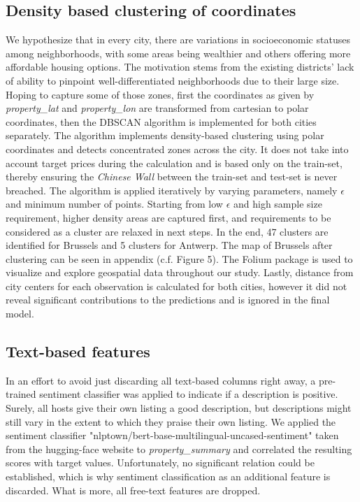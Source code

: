\documentclass[11pt, oneside]{article}   	%
\begin{document}
\subsection{Density based clustering of coordinates}
We hypothesize that in every city, there are variations in socioeconomic statuses among neighborhoods, with some areas being wealthier and others offering more affordable housing options. The motivation stems from the existing districts' lack of ability to pinpoint well-differentiated neighborhoods due to their large size. Hoping to capture some of those zones, first the coordinates as given by \textit{property\_lat} and \textit{property\_lon} are transformed from cartesian to polar coordinates, then the DBSCAN algorithm is implemented for both cities separately. The algorithm implements density-based clustering using polar coordinates and detects concentrated zones across the city. It does not take into account target prices during the calculation and is based only on the train-set, thereby ensuring the \textit{Chinese Wall} between the train-set and test-set is never breached.\newline 
\indent The algorithm is applied iteratively by varying parameters, namely $\epsilon$ and minimum number of points. Starting from low $\epsilon$ and high sample size requirement, higher density areas are captured first, and requirements to be considered as a cluster are relaxed in next steps. In the end, 47 clusters are identified for Brussels and 5 clusters for Antwerp.\newline 
\indent The map of Brussels after clustering can be seen in appendix (c.f. Figure 5). The Folium package is used to visualize and explore geospatial data throughout our study. Lastly, distance from city centers for each observation is calculated for both cities, however it did not reveal significant contributions to the predictions and is ignored in the final model.


\subsection{Text-based features}
In an effort to avoid just discarding all text-based columns right away, a pre-trained sentiment classifier was applied to indicate if a description is positive. Surely, all hosts give their own listing a good description, but descriptions might still vary in the extent to which they praise their own listing. We applied the sentiment classifier "nlptown/bert-base-multilingual-uncased-sentiment" taken from the hugging-face website to \textit{property\_summary} and correlated the resulting scores with target values. Unfortunately, no significant relation could be established, which is why sentiment classification as an additional feature is discarded. What is more, all free-text features are dropped.
\end{document}
